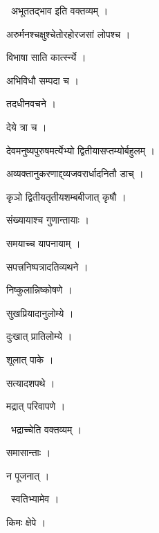 \documentclass[10pt, openany, oneside]{book}
\begin{document}
\par\noindent\hspace{1.5em}{\vps वा॰}~{\qt अभूततद्भाव इति वक्तव्यम् ।}

\noindent अरुर्मनश्चक्षुश्चेतोरहोरजसां लोपश्च ।

\noindent विभाषा साति कार्त्स्न्ये ।

\noindent अभिविधौ सम्पदा च ।

\noindent तदधीनवचने ।

\noindent देये त्रा च ।

\noindent देवमनुष्यपुरुषमर्त्येभ्यो द्वितीयासप्तम्योर्बहुलम् ।

\noindent अव्यक्तानुकरणाद्द्व्यजवरार्धादनितौ डाच् ।

\noindent कृञो द्वितीयतृतीयशम्बबीजात् कृषौ ।

\noindent संख्यायाश्च गुणान्तायाः ।

\noindent समयाच्च यापनायाम् ।

\noindent सपत्त्रनिष्पत्रादतिव्यथने ।

\noindent निष्कुलान्निष्कोषणे ।

\noindent सुखप्रियादानुलोम्ये ।

\noindent दुःखात् प्रातिलोम्ये ।

\noindent शूलात् पाके ।

\noindent सत्यादशपथे ।

\noindent मद्रात् परिवापणे ।

\par\noindent\hspace{1.5em}{\vps वा॰}~{\qt भद्राच्चेति वक्तव्यम् ।}

\noindent समासान्ताः ।

\noindent न पूजनात् ।

\par\noindent\hspace{1.5em}{\vps वा॰}~{\qt स्वतिभ्यामेव ।}

\noindent किमः क्षेपे ।
\end{document}
